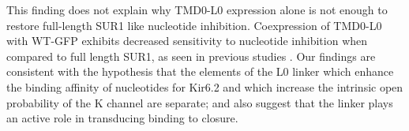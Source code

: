 This finding does not explain why TMD0-L0 expression alone is not enough to restore full-length SUR1 like nucleotide inhibition.
Coexpression of TMD0-L0 with WT-GFP exhibits decreased sensitivity to nucleotide inhibition when compared to full length SUR1, as seen in previous studies \cite{babenko_sur_2003, chan_n-terminal_2003-1, pratt_n-terminal_2011}.
Our findings are consistent with the hypothesis that the elements of the L0 linker which enhance the binding affinity of nucleotides for Kir6.2 and which increase the intrinsic open probability of the K\ATP{} channel are separate; and also suggest that the linker plays an active role in transducing binding to closure.
